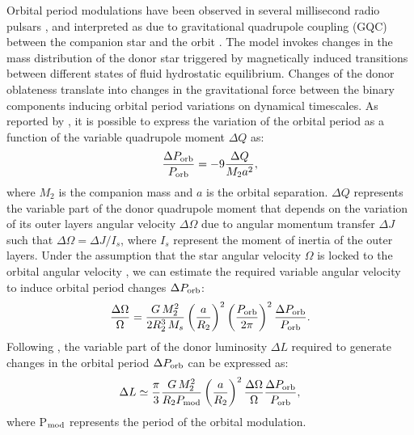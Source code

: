 \documentclass[fleqn,usenatbib]{mnras}
\begin{document}
Orbital period modulations have been observed in several millisecond radio pulsars \citep[e.g., PSR B1957$+$20, PSR J2051$-$0827, and PSR J2339$-$0533;][]{ Applegate:1994vp,Doroshenko2001a,Pletsch2015a}, and interpreted as due to gravitational quadrupole coupling (GQC) between the companion star and the orbit \citep{Applegate:1992uh, Applegate:1994vp}. The model invokes changes in the mass distribution of the donor star triggered by magnetically induced transitions between different states of fluid hydrostatic equilibrium. Changes of the donor oblateness translate into changes in the gravitational force between the binary components inducing orbital period variations on dynamical timescales. As reported by \citet{Applegate:1992uh}, it is possible to express the variation of the orbital period as a function of the variable quadrupole moment $\Delta Q$ as:
\begin{eqnarray}
\frac{\Delta P_{\rm orb}}{P_{\rm orb}}= -9\frac{\Delta Q}{M_2 a^2},
\label{eq:ap1}
\end{eqnarray}
where $M_2$ is the companion mass and $a$ is the orbital separation. 
$\Delta Q$ represents the variable part of the donor quadrupole moment that depends on the variation of its outer layers angular velocity $\Delta \Omega$ due to angular momentum transfer $\Delta J$ such that $\Delta \Omega=\Delta J /I_s$, where $I_s$ represent the moment of inertia of the outer layers. 
Under the assumption that the star angular velocity $\Omega$ is locked to the orbital angular velocity \citep{Applegate:1994vp}, we can estimate the required variable angular velocity to induce orbital period changes $\Delta P_{\rm orb}$:
\begin{eqnarray}
\frac{\Delta \Omega}{\Omega}= \frac{G\,M_2^2}{2R_2^3\,M_s} \left(\frac{a}{R_2}\right)^2\left(\frac{P_{\rm orb}}{2\pi}\right)^2 \frac{\Delta P_{\rm orb}}{P_{\rm orb}}.
\label{eq:ap3}
\end{eqnarray}
Following \citet{Applegate:1992uh}, the variable part of the donor luminosity $\Delta L$ required to generate changes in the orbital period $\Delta P_{\rm orb}$ can be expressed as:
\begin{eqnarray}
\Delta L\simeq \frac{\pi}{3} \frac{G\,M_2^2}{R_2 P_{\rm mod}} \left(\frac{a}{R_2}\right)^2 \frac{\Delta \Omega}{\Omega} \frac{\Delta P_{\rm orb}}{P_{\rm orb}},
\label{eq:ap5}
\end{eqnarray}
where P$_{\rm mod}$ represents the period of the orbital modulation. 
\end{document}
